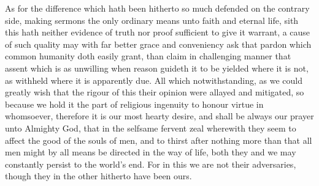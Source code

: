As for the difference which hath been hitherto so much defended on the contrary side, making sermons the only ordinary means unto faith and eternal life, sith this hath neither evidence of truth nor proof sufficient to give it warrant, a cause of such quality may with far better grace and conveniency ask that pardon which common humanity doth easily grant, than claim in challenging manner that assent which is as unwilling when reason guideth it to be yielded where it is not, as withheld where it is apparently due.
All which notwithstanding, as we could greatly wish that the rigour of this their opinion were allayed and mitigated, so because we hold it the part of religious ingenuity to honour virtue in whomsoever, therefore it is our most hearty desire, and shall be always our prayer unto Almighty God, that in the selfsame fervent zeal wherewith they seem to affect the good of the souls of men, and to thirst after nothing more than that all men might by all means be directed in the way of life, both they and we may constantly persist to the world’s end. For in this we are not their adversaries, though they in the other hitherto have been ours.

